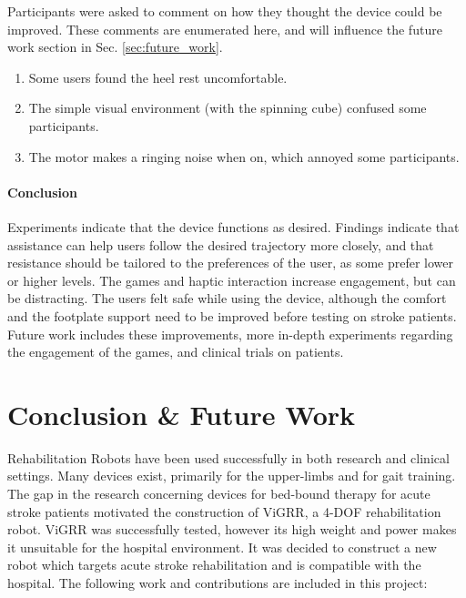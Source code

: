 \documentclass[12pt]{report}
\begin{document}
Participants were asked to comment on how they thought the device could be improved. These comments are enumerated here, and will influence the future work section in Sec. \ref{sec:future_work}. 		
		
		\begin{enumerate}
			\item Some users found the heel rest uncomfortable. 
			\item The simple visual environment (with the spinning cube) confused some participants.
			\item The motor makes a ringing noise when on, which annoyed some participants.
		
		
		\end{enumerate}
		
\subsubsection{Conclusion}

 Experiments indicate that the device functions as desired. Findings indicate that assistance can help users follow the desired trajectory more closely, and that resistance should be tailored to the preferences of the user, as some prefer lower or higher levels. The games and haptic interaction increase engagement, but can be distracting. The users felt safe while using the device, although the comfort and the footplate support need to be improved before testing on stroke patients. Future work includes these improvements, more in-depth experiments regarding the engagement of the games, and clinical trials on patients. 
	

\chapter{Conclusion \& Future Work} \label{ch_conc}

	Rehabilitation Robots have been used successfully in both research and clinical settings. Many devices exist, primarily for the upper-limbs and for gait training. The gap in the research concerning devices for bed-bound therapy for acute stroke patients motivated the construction of ViGRR, a 4-DOF rehabilitation robot. ViGRR was successfully tested, however its high weight and power makes it unsuitable for the hospital environment. It was decided to construct a new robot which targets acute stroke rehabilitation and is compatible with the hospital. The following work and contributions are included in this project: 
	
\end{document}

